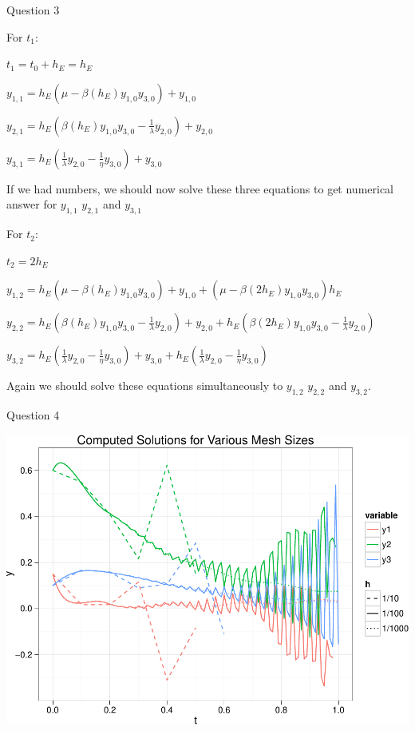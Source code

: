 \documentclass{beamer}
\begin{document}
\begin{frame}{Question 3}


For $t_1$:

$t_1 = t_0 + h_E = h_E$

$y_{1,1} = h_E(\mu - \beta (h_E)y_{1,0}y_{3,0}) + y_{1,0}$

$y_{2,1} = h_E\left(\beta (h_E)y_{1,0}y_{3,0} - \frac{1}{\lambda}y_{2,0}\right) + y_{2,0}$

$y_{3,1} = h_E\left(\frac{1}{\lambda}y_{2,0} - \frac{1}{\eta}y_{3,0} \right ) + y_{3,0}$

If we had numbers, we should now solve these three equations to get numerical answer for $y_{1,1}$ $y_{2,1}$ and $y_{3,1}$

For $t_2$:

$t_2 = 2h_E$

$y_{1,2} = h_E(\mu - \beta (h_E)y_{1,0}y_{3,0}) + y_{1,0} + (\mu - \beta(2h_E)y_{1,0}y_{3,0})h_E$

$y_{2,2} = h_E\left(\beta (h_E)y_{1,0}y_{3,0} - \frac{1}{\lambda}y_{2,0}\right) + y_{2,0} + h_E\left(\beta (2h_E)y_{1,0}y_{3,0} - \frac{1}{\lambda}y_{2,0}\right)$

$y_{3,2} = h_E\left(\frac{1}{\lambda}y_{2,0} - \frac{1}{\eta}y_{3,0} \right ) + y_{3,0} + h_E\left(\frac{1}{\lambda}y_{2,0} - \frac{1}{\eta}y_{3,0} \right )$

Again we should solve these equations simultaneously to $y_{1,2}$ $y_{2,2}$ and $y_{3,2}$.


\end{frame}

\begin{frame}{Question 4}
	\begin{center}
		\includegraphics[width=\textwidth]{plot-crop.pdf}
	\end{center}
\end{frame}
\end{document}
